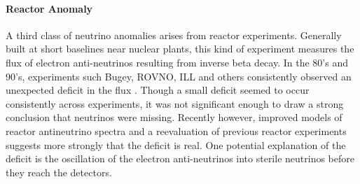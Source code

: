 \documentclass[12pt]{article}
\begin{document}

\paragraph{Reactor Anomaly}
A third class of neutrino anomalies arises from reactor experiments. Generally built at short baselines near nuclear plants, this kind of experiment measures the flux of electron anti-neutrinos resulting from inverse beta decay. In the 80's and 90's, experiments such Bugey, ROVNO, ILL and others consistently observed an unexpected deficit in the flux \cite{bib:bugey} \cite{bib:rovno}. Though a small deficit seemed to occur consistently across experiments, it was not significant enough to draw a strong conclusion that neutrinos were missing.  Recently however, improved models of reactor antineutrino spectra \cite{bib:reactorImproved} and a reevaluation of previous reactor experiments \cite{bib:reactorGeneral} suggests more strongly that the deficit is real.  One potential explanation of the deficit is the oscillation of the electron anti-neutrinos into sterile neutrinos before they reach the detectors.  
\end{document}
